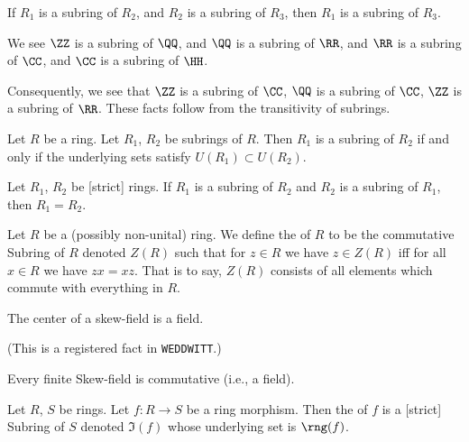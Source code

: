 \begin{theorem}
If $R_{1}$ is a subring of $R_{2}$, and $R_{2}$ is a subring of
$R_{3}$, then $R_{1}$ is a subring of $R_{3}$.
\end{theorem}

\begin{example}
We see $\ZZ$ is a subring of $\QQ$, and $\QQ$ is a subring of $\RR$,
and $\RR$ is a subring of $\CC$,
and $\CC$ is a subring of $\HH$.

Consequently, we see that $\ZZ$ is a subring of $\CC$, $\QQ$ is a
subring of $\CC$, $\ZZ$ is a subring of $\RR$. These facts follow from
the transitivity of subrings.
\end{example}

\begin{theorem}
Let $R$ be a ring. Let $R_{1}$, $R_{2}$ be subrings of $R$.
Then $R_{1}$ is a subring of $R_{2}$ if and only if the underlying
sets satisfy $U(R_{1})\subset U(R_{2})$.
\end{theorem}

\begin{theorem}
Let $R_{1}$, $R_{2}$ be [strict] rings.
If $R_{1}$ is a subring of $R_{2}$ and $R_{2}$ is a subring of
$R_{1}$, then $R_{1}=R_{2}$.
\end{theorem}

\begin{definition}
Let $R$ be a (possibly non-unital) ring. We define the  of $R$
to be the commutative Subring of $R$ denoted $Z(R)$ such that
for $z\in R$ we have $z\in Z(R)$ iff for all $x\in R$ we have $zx=xz$.
That is to say, $Z(R)$ consists of all elements which commute with
everything in $R$.
\end{definition}

\begin{theorem}
The center of a skew-field is a field.
\end{theorem}

(This is a registered fact in \texttt{WEDDWITT}.)

\begin{theorem}
Every finite Skew-field is commutative (i.e., a field).
\end{theorem}

\begin{definition}
Let $R$, $S$ be rings. Let $f\colon R\to S$ be a ring morphism.
Then the  of $f$ is a [strict] Subring of $S$ denoted $\Im(f)$
whose underlying set is $\rng(f)$.
\end{definition}

